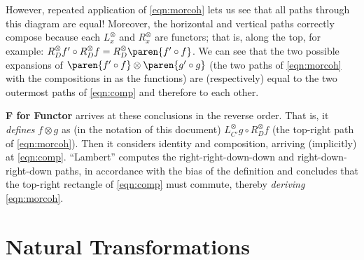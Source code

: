 \documentclass[letterpaper]{article}
\begin{document}
However, repeated application of \autoref{eqn:morcoh} lets us see that all
paths through this diagram are equal!  Moreover, the horizontal and vertical
paths correctly compose because each $L^\otimes_x$ and $R^\otimes_x$ are functors; that is,
along the top, for example: $R^\otimes_D f' \circ R^\otimes_D f = R^\otimes_D \paren{ f' \circ f }$.
We can see that the two possible expansions of $\paren{ f' \circ f } \otimes
\paren{ g' \circ g }$ (the two paths of \autoref{eqn:morcoh} with the
compositions in as the functions) are (respectively) equal to the two
outermost paths of \autoref{eqn:comp} and therefore to each other.

{\bf F for Functor} arrives at these conclusions in the reverse order.  That
is, it {\em defines} $f \otimes g$ as (in the notation of this document)
$L^\otimes_{C'} g \circ R^\otimes_{D} f$ (the top-right path of \autoref{eqn:morcoh}).  Then
it considers identity and composition, arriving (implicitly) at
\autoref{eqn:comp}.  ``Lambert'' computes the right-right-down-down and
right-down-right-down paths, in accordance with the bias of the definition
and concludes that the top-right rectangle of \autoref{eqn:comp} must
commute, thereby {\em deriving} \autoref{eqn:morcoh}.

\section{Natural Transformations}
\end{document}
